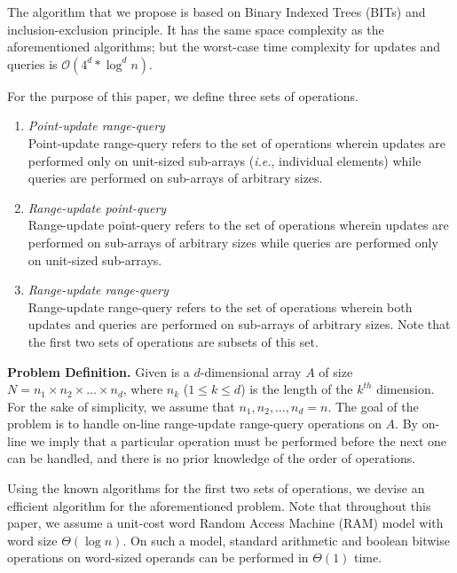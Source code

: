 \documentclass[a4paper]{article}
\begin{document}
\vspace{2 mm}
The algorithm that we propose is based on Binary Indexed Trees\cite{BIT} (BITs) and inclusion-exclusion principle. It has the same space complexity as the aforementioned algorithms; but the worst-case time complexity for updates and queries is $\mathcal{O}(4^d*\log^{d}n)$.

\vspace{2 mm}
\noindent
For the purpose of this paper, we define three sets of operations.

\begin{enumerate}
\item \textit{Point-update range-query}\\
Point-update range-query refers to the set of operations wherein updates are performed only on unit-sized sub-arrays (\textit{i.e.}, individual elements) while queries are performed on sub-arrays of arbitrary sizes.
\item \textit{Range-update point-query}\\
Range-update point-query refers to the set of operations wherein updates are performed on sub-arrays of arbitrary sizes while queries are performed only on unit-sized sub-arrays.
\item \textit{Range-update range-query}\\
Range-update range-query refers to the set of operations wherein both updates and queries are performed on sub-arrays of arbitrary sizes. Note that the first two sets of operations are subsets of this set.
\end{enumerate}

\noindent
\textbf{Problem Definition.} Given is a $d$-dimensional array $A$ of size $N = n_1\times n_2 \times \dots \times n_d$, where $n_k$ ($1 \leq k \leq d$) is the length of the $k^{th}$ dimension. For the sake of simplicity, we assume that $n_1, n_2, \dots, n_d = n$. The goal of the problem is to handle on-line range-update range-query operations on $A$. By on-line we imply that a particular operation must be performed before the next one can be handled, and there is no prior knowledge of the order of operations.

\vspace{2 mm}
Using the known algorithms for the first two sets of operations, we devise an efficient algorithm for the aforementioned problem. Note that throughout this paper, we assume a unit-cost word Random Access Machine (RAM) model with word size $\Theta(\log n)$. On such a model, standard arithmetic and boolean bitwise operations on word-sized operands can be performed in $\Theta(1)$ time.
\end{document}
